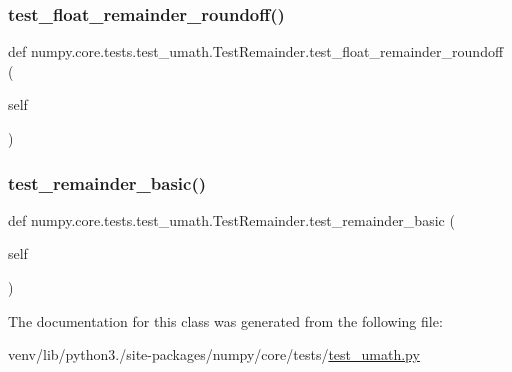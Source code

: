 \subsubsection{\texorpdfstring{test\+\_\+float\+\_\+remainder\+\_\+roundoff()}{test\_float\_remainder\_roundoff()}}
{\footnotesize\ttfamily def numpy.\+core.\+tests.\+test\+\_\+umath.\+Test\+Remainder.\+test\+\_\+float\+\_\+remainder\+\_\+roundoff (\begin{DoxyParamCaption}\item[{}]{self }\end{DoxyParamCaption})}

\mbox{\label{classnumpy_1_1core_1_1tests_1_1test__umath_1_1TestRemainder_ad824adcfa7929e6ae7312227bb6284d5}} 
\subsubsection{\texorpdfstring{test\+\_\+remainder\+\_\+basic()}{test\_remainder\_basic()}}
{\footnotesize\ttfamily def numpy.\+core.\+tests.\+test\+\_\+umath.\+Test\+Remainder.\+test\+\_\+remainder\+\_\+basic (\begin{DoxyParamCaption}\item[{}]{self }\end{DoxyParamCaption})}



The documentation for this class was generated from the following file\+:\begin{DoxyCompactItemize}
\item 
venv/lib/python3./site-\/packages/numpy/core/tests/\hyperlink{test__umath_8py}{test\+\_\+umath.\+py}\end{DoxyCompactItemize}
